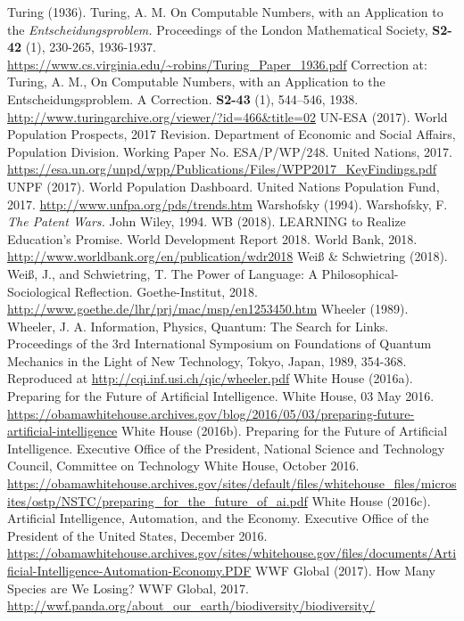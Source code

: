 \begin{multicols}{2}
\begin{thebibliography}{99}
 Turing (1936). Turing, A. M. On Computable Numbers, with an Application to the \textit{Entscheidungsproblem.} Proceedings of the London Mathematical Society, \textbf{S2-42} (1), 230-265, 1936-1937. \url{https://www.cs.virginia.edu/~robins/Turing_Paper_1936.pdf} Correction at: Turing, A. M., On Computable Numbers, with an Application to the Entscheidungsproblem. A Correction. \textbf{S2-43} (1), 544–546, 1938. \url{http://www.turingarchive.org/viewer/?id=466&title=02}
 UN-ESA (2017). World Population Prospects, 2017 Revision. Department of Economic and Social Affairs, Population Division. Working Paper No. ESA/P/WP/248. United Nations, 2017. \url{https://esa.un.org/unpd/wpp/Publications/Files/WPP2017_KeyFindings.pdf}
 UNPF (2017). World Population Dashboard. United Nations Population Fund, 2017. \url{http://www.unfpa.org/pds/trends.htm}
 Warshofsky (1994). Warshofsky, F. \textit{The Patent Wars.} John Wiley, 1994.
 WB (2018). LEARNING to Realize Education’s Promise. World Development Report 2018. World Bank, 2018. \url{http://www.worldbank.org/en/publication/wdr2018}
 Weiß \& Schwietring (2018). Weiß, J., and Schwietring, T. The Power of Language: A Philosophical-Sociological Reflection. Goethe-Institut, 2018. \url{http://www.goethe.de/lhr/prj/mac/msp/en1253450.htm}
 Wheeler (1989). Wheeler, J. A. Information, Physics, Quantum: The Search for Links. Proceedings of the 3rd International Symposium on Foundations of Quantum Mechanics in the Light of New Technology, Tokyo, Japan, 1989, 354-368. Reproduced at \url{http://cqi.inf.usi.ch/qic/wheeler.pdf}
 White House (2016a). Preparing for the Future of Artificial Intelligence. White House, 03 May 2016. \url{https://obamawhitehouse.archives.gov/blog/2016/05/03/preparing-future-artificial-intelligence}
 White House (2016b). Preparing for the Future of Artificial Intelligence. Executive Office of the President, National Science and Technology Council, Committee on Technology White House, October 2016. \url{https://obamawhitehouse.archives.gov/sites/default/files/whitehouse_files/microsites/ostp/NSTC/preparing_for_the_future_of_ai.pdf}
 White House (2016c). Artificial Intelligence, Automation, and the Economy. Executive Office of the President of the United States, December 2016. \url{https://obamawhitehouse.archives.gov/sites/whitehouse.gov/files/documents/Artificial-Intelligence-Automation-Economy.PDF}
 WWF Global (2017). How Many Species are We Losing? WWF Global, 2017. \url{http://wwf.panda.org/about_our_earth/biodiversity/biodiversity/}

\end{thebibliography}
\end{multicols}
